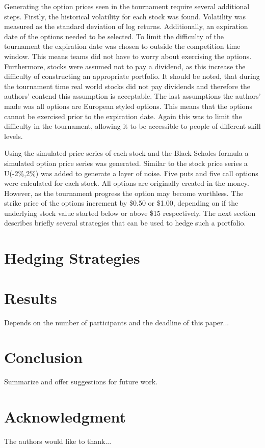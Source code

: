 \documentclass[conference, draftcls]{IEEEtran}
\begin{document}
Generating the option prices seen in the tournament require several additional steps. Firstly, the historical volatility for each stock was found. Volatility was measured as the standard deviation of log returns.  Additionally, an expiration date of the options needed to be selected. To limit the difficulty of the tournament the expiration date was chosen to outside the competition time window. This means teams did not have to worry about exercising the options. Furthermore, stocks were assumed not to pay a dividend, as this increase the difficulty of constructing an appropriate portfolio. It should be noted, that during the tournament time real world stocks did not pay dividends and therefore the authors’ contend this assumption is acceptable. The last assumptions the authors’ made was all options are European styled options. This means that the options cannot be exercised prior to the expiration date. Again this was to limit the difficulty in the tournament, allowing it to be accessible to people of different skill levels.

Using the simulated price series of each stock and the Black-Scholes formula a simulated option price series was generated. Similar to the stock price series a U(-2\%,2\%) was added to generate a layer of noise. Five puts and five call options were calculated for each stock. All options are originally created in the money. However, as the tournament progress the option may become worthless. The strike price of the options increment by \$0.50 or \$1.00, depending on if the underlying stock value started below or above \$15 respectively. The next section describes briefly several strategies that can be used to hedge such a portfolio.

\section{Hedging Strategies}

\section{Results}
Depends on the number of participants and the deadline of this paper...

\section{Conclusion}
Summarize and offer suggestions for future work.

\section*{Acknowledgment}
The authors would like to thank...



\end{document}
